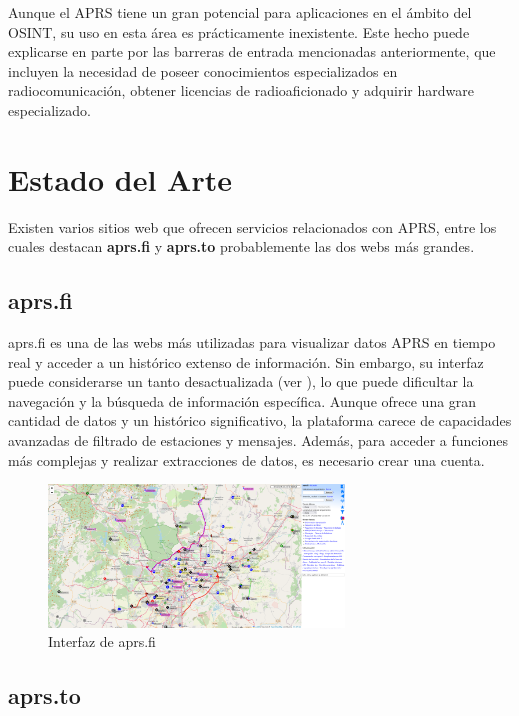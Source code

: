 Aunque el APRS tiene un gran potencial para aplicaciones en el ámbito del OSINT, su uso en esta área es prácticamente inexistente. Este hecho puede explicarse en parte por las barreras de entrada mencionadas anteriormente, que incluyen la necesidad de poseer conocimientos especializados en radiocomunicación, obtener licencias de radioaficionado y adquirir hardware especializado.

\section{Estado del Arte}

Existen varios sitios web que ofrecen servicios relacionados con APRS, entre los cuales destacan \textbf{aprs.fi} y \textbf{aprs.to} probablemente las dos webs más grandes.

\subsection{aprs.fi}

aprs.fi es una de las webs más utilizadas para visualizar datos APRS en tiempo real y acceder a un histórico extenso de información. Sin embargo, su interfaz puede considerarse un tanto desactualizada (ver ), lo que puede dificultar la navegación y la búsqueda de información específica. Aunque ofrece una gran cantidad de datos y un histórico significativo, la plataforma carece de capacidades avanzadas de filtrado de estaciones y mensajes. Además, para acceder a funciones más complejas y realizar extracciones de datos, es necesario crear una cuenta.

\begin{figure}[h]
    \centering
    \includegraphics[width=0.7\textwidth]{Imagenes/Chapter_2/aprs-fi.png}
    \caption{Interfaz de aprs.fi}
    \label{fig:aprs-fi}
\end{figure}

\subsection{aprs.to}

